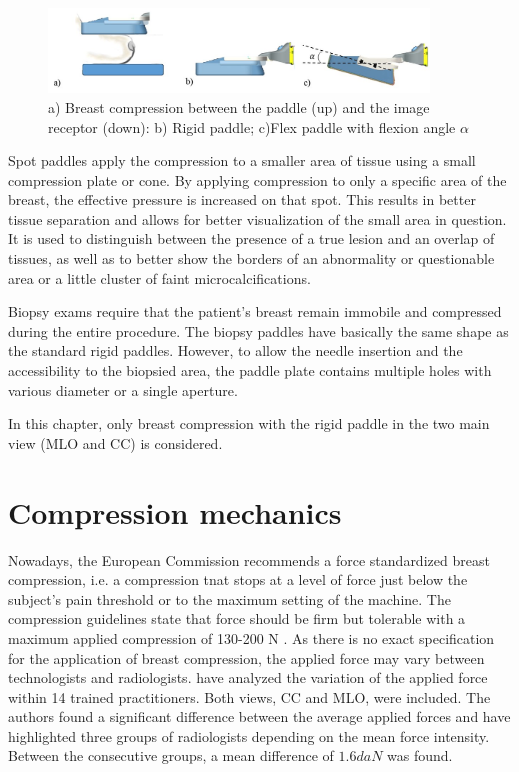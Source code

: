 \begin{figure}[!h]
\centering
\includegraphics[width=0.9\textwidth,keepaspectratio]{figures/compressionpaddles.jpg} 
\caption{a) Breast compression between the paddle (up) and the image receptor (down): b) Rigid paddle; c)Flex paddle with flexion angle $\alpha$}\label{fig:compressionpaddles}
\end{figure}


 Spot paddles apply the compression to a smaller area of tissue using a small compression plate or cone. By applying compression to only a specific area of the breast, the effective pressure is increased on that spot. This results in better tissue separation and allows for better visualization of the small area in question.  It is used to distinguish between the presence of a true lesion and an overlap of tissues, as well as to better show the borders of an abnormality or questionable area or a little cluster of faint microcalcifications.  

Biopsy exams require that the patient's breast remain immobile and compressed during the entire procedure. The biopsy paddles have basically the same shape as the standard rigid paddles. However, to allow the needle insertion and the accessibility to the biopsied area, the paddle plate contains multiple holes with various diameter or a single aperture. 

In this chapter, only breast compression with the rigid paddle in the two main view (MLO and CC) is considered.

\section{Compression mechanics} \label{subsec:compressionmechanics}
Nowadays, the European Commission recommends a force standardized breast compression, i.e. a compression tnat stops at a level of force just below the subject's pain threshold or to the maximum setting of the machine.  The compression guidelines state that force should be firm but tolerable with a maximum applied compression of 130-200 N \citep{perry_european_2008}. As there is no exact specification for the application of breast compression, the applied force may vary between technologists and radiologists. \cite{mercer_practitioner_2013} have analyzed the variation of the applied force within 14 trained practitioners. Both views, CC and MLO, were included. The authors found a significant difference between the average applied forces and have highlighted three groups of radiologists depending on the mean force intensity. Between the consecutive groups, a mean difference of $1.6daN$ was found. 


